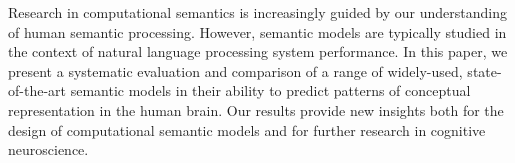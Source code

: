 Research in computational semantics is increasingly guided by our understanding of human semantic processing. However, semantic models are typically studied in the context of natural language processing system performance. In this paper, we present a systematic evaluation and comparison of a range of widely-used, state-of-the-art semantic models in their ability to predict patterns of conceptual representation in the human brain. Our results provide new insights both for the design of computational semantic models and for further research in cognitive neuroscience.
